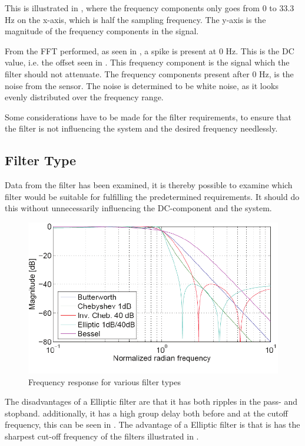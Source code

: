 This is illustrated in , where the frequency components only goes from 0 to 33.3 Hz on the x-axis, which is half the sampling frequency. The y-axis is the magnitude of the frequency components in the signal.

From the FFT performed, as seen in , a spike is present at 0 \si{Hz}. This is the DC value, i.e. the offset seen in . This frequency component is the signal which the filter should not attenuate. The frequency components present after 0 Hz, is the noise from the sensor. The noise is determined to be white noise, as it looks evenly distributed over the frequency range.

Some considerations have to be made for the filter requirements, to ensure that the filter is not influencing the system and the desired frequency needlessly.

\subsection{Filter Type}
Data from the filter has been examined, it is thereby possible to examine which filter would be suitable for fulfilling the predetermined requirements. It should do this without unnecessarily influencing the DC-component and the system.

\begin{figure}[H]
	\centering
	\includegraphics[scale=1]{figures/Filtertypes1.pdf}
	\caption{Frequency response for various filter types}
	\label{fig:Filtertype1}
\end{figure}\vspace{-5mm}

The disadvantages of a Elliptic filter are that it has both ripples in the pass- and stopband. additionally, it has a high group delay both before and at the cutoff frequency, this can be seen in . The advantage of a Elliptic filter is that is has the sharpest cut-off frequency of the filters illustrated in .

